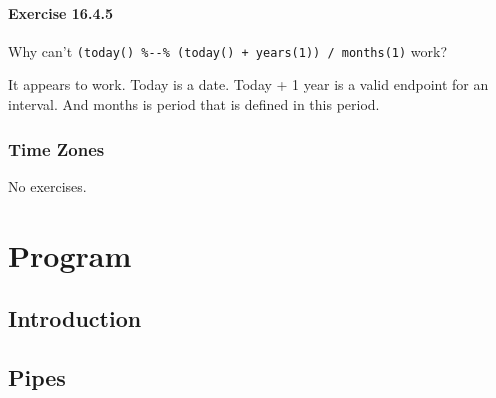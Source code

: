\documentclass[]{book}
\newenvironment{Shaded}{\begin{snugshade}}{\end{snugshade}}
\newcommand{\CommentTok}[1]{\textcolor[rgb]{0.56,0.35,0.01}{\textit{#1}}}
\newcommand{\DecValTok}[1]{\textcolor[rgb]{0.00,0.00,0.81}{#1}}
\newcommand{\KeywordTok}[1]{\textcolor[rgb]{0.13,0.29,0.53}{\textbf{#1}}}
\newcommand{\NormalTok}[1]{#1}
\newcommand{\OperatorTok}[1]{\textcolor[rgb]{0.81,0.36,0.00}{\textbf{#1}}}
\newcommand{\StringTok}[1]{\textcolor[rgb]{0.31,0.60,0.02}{#1}}
\theoremstyle{plain}
\theoremstyle{remark}
\theoremstyle{definition}
\theoremstyle{definition}
\theoremstyle{definition}
\theoremstyle{remark}
\begin{document}
\hypertarget{exercise-16.4.5}{%
\subsection*{\texorpdfstring{Exercise
{16.4.5}}{Exercise 16.4.5}}\label{exercise-16.4.5}}

Why can't
\texttt{(today()\ \%-\/-\%\ (today()\ +\ years(1))\ /\ months(1)} work?

It appears to work. Today is a date. Today + 1 year is a valid endpoint
for an interval. And months is period that is defined in this period.

\begin{Shaded}
\end{Shaded}

\hypertarget{time-zones}{%
\section{Time Zones}\label{time-zones}}

No exercises.

\hypertarget{part-program}{%
\part{Program}\label{part-program}}

\hypertarget{program-intro}{%
\chapter{Introduction}\label{program-intro}}

\hypertarget{pipes}{%
\chapter{Pipes}\label{pipes}}
\end{document}
